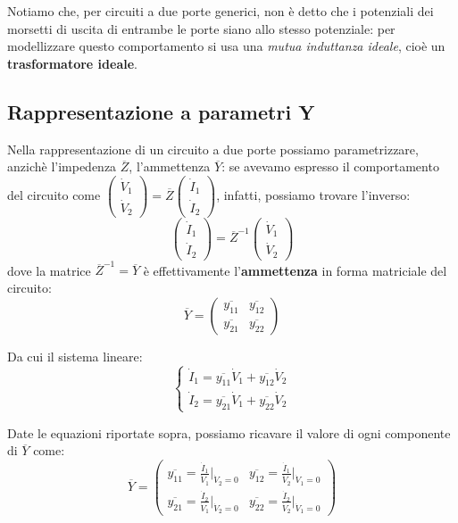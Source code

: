 \documentclass[a4paper,11pt]{article}
\begin{document}
Notiamo che, per circuiti a due porte generici, non è detto che i potenziali dei morsetti di uscita di entrambe le porte siano allo stesso potenziale: per modellizzare questo comportamento si usa una \textit{mutua induttanza ideale}, cioè un \textbf{trasformatore ideale}.


\subsection{Rappresentazione a parametri Y}
Nella rappresentazione di un circuito a due porte possiamo parametrizzare, anzichè l'impedenza $\overline{Z}$, l'ammettenza $\overline{Y}$: se avevamo espresso il comportamento del circuito come $
\begin{pmatrix}
	\dot{V}_1 \\ \dot{V}_2
\end{pmatrix}
= \overline{Z}
\begin{pmatrix}
	\dot{I}_1 \\ \dot{I}_2
\end{pmatrix}
$, infatti, possiamo trovare l'inverso:
$$
\begin{pmatrix}
	\dot{I}_1 \\ \dot{I}_2
\end{pmatrix}
= \overline{Z}^{-1}
\begin{pmatrix}
	\dot{V}_1 \\ \dot{V}_2
\end{pmatrix}
$$
dove la matrice $\overline{Z}^{-1} = \overline{Y}$ è effettivamente l'\textbf{ammettenza} in forma matriciale del circuito:
$$
\overline{Y} =
\begin{pmatrix}
	\overline{y_{11}} & \overline{y_{12}} \\ 
	\overline{y_{21}} & \overline{y_{22}}
\end{pmatrix}
$$

Da cui il sistema lineare:
\[
	\begin{cases}
		\dot{I}_1 = \overline{y_{11}} \dot{V}_1 + \overline{y_{12}} \dot{V}_2 \\ 	
		\dot{I}_2 = \overline{y_{21}} \dot{V}_1 + \overline{y_{22}} \dot{V}_2 	
	\end{cases}
\]

Date le equazioni riportate sopra, possiamo ricavare il valore di ogni componente di $\overline{Y}$ come:
$$
\overline{Y} =
\begin{pmatrix}
	\overline{y_{11}} = \frac{\dot{I}_1}{\dot{V}_1} \Big|_{\dot{V}_2 = 0} &
	\overline{y_{12}} = \frac{\dot{I}_1}{\dot{V}_2} \Big|_{\dot{V}_1 = 0} \\
	\overline{y_{21}} = \frac{\dot{I}_2}{\dot{V}_1} \Big|_{\dot{V}_2 = 0} &
	\overline{y_{22}} = \frac{\dot{I}_2}{\dot{V}_2} \Big|_{\dot{V}_1 = 0}
\end{pmatrix}
$$
\end{document}
